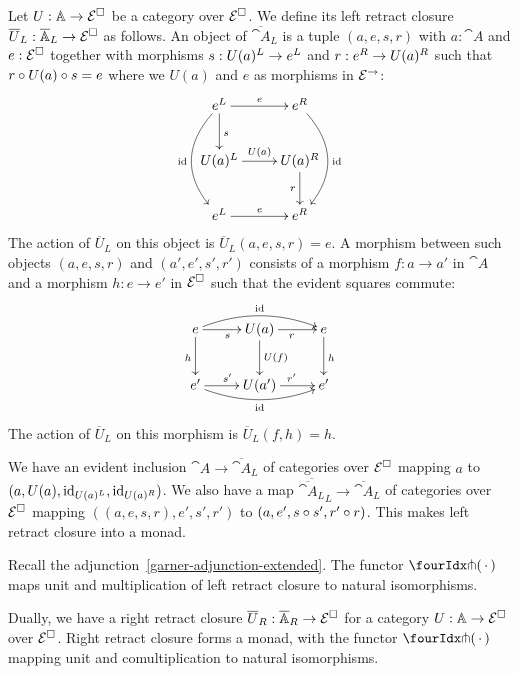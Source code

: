 \documentclass[reqno,10pt,a4paper,oneside]{amsart}
\begin{document}
Let $U : \mathbb{A} \to \mathcal{E}^{\Box}$ be a category over $\mathcal{E}^{\Box}$.
We define its left retract closure $\overline{U}_L : \overline{\mathbb{A}}_L \to \mathcal{E}^{\Box}$ as follows.
An object of $\overline{\cat{A}}_L$ is a tuple $(a, e, s, r)$ with $a : \cat{A}$ and $e : \mathcal{E}^{\Box}$ together with morphisms $s : U(a){}^L \to e{}^L$ and $r : e{}^R \to U(a){}^R$ such that $r \mathbin{\circ} U(a) \mathbin{\circ} s = e$ where we $U(a)$ and $e$ as morphisms in $\mathcal{E}^{\to}$:
\[
\xymatrix{
  e\sql
  \ar[r]^{e}
  \ar[d]^{s}
  \ar@/_2em/[dd]_{\id}
&
  e\sqr
  \ar@/^2em/[dd]^{\id}
\\
  U(a)\sql
  \ar[r]^{U(a)}
&
  U(a)\sqr
  \ar[d]_{r}
\\
  e\sql
  \ar[r]^{e}
&
  e\sqr
}
\]
The action of $\overline{U}_L$ on this object is $\overline{U}_L(a, e, s, r) = e$.
A morphism between such objects $(a, e, s, r)$ and $(a', e', s', r')$ consists of a morphism $f : a \to a'$ in $\cat{A}$ and a morphism $h : e \to e'$ in $\mathcal{E}^{\Box}$ such that the evident squares commute:
\[
\xymatrix{
  e
  \ar[r]_{s}
  \ar@/^1em/[rr]^{\id}
  \ar[d]_{h}
&
  U(a)
  \ar[r]_{r}
  \ar[d]^{U(f)}
&
  e
  \ar[d]^{h}
\\
  e'
  \ar[r]^{s'}
  \ar@/_1em/[rr]_{\id}
&
  U(a')
  \ar[r]^{r'}
&
  e'
}
\]
The action of $\overline{U}_L$ on this morphism is $\overline{U}_L(f, h) = h$.

We have an evident inclusion $\cat{A} \to \overline{\cat{A}}_L$ of categories over $\mathcal{E}^{\Box}$ mapping $a$ to $(a, U(a), \operatorname{id}_{U(a){}^L}, \operatorname{id}_{U(a){}^R})$.
We also have a map $\overline{\overline{\cat{A}}_L}_L \to \overline{\cat{A}}_L$ of categories over $\mathcal{E}^{\Box}$ mapping $((a, e, s, r), e', s', r')$ to $(a, e', s \mathbin{\circ} s', r' \mathbin{\circ} r)$.
This makes left retract closure into a monad.

\begin{lemma}
\label{retract-closure-extended-left}
Recall the adjunction~\eqref{garner-adjunction-extended}.
The functor $\liftr{\brarghole}$ maps unit and multiplication of left retract closure to natural isomorphisms.
\end{lemma}

\begin{remark}
\label{retract-closure-extended-right}
Dually, we have a right retract closure $\overline{U}_R : \overline{\mathbb{A}}_R \to \mathcal{E}^{\Box}$ for a category $U : \mathbb{A} \to \mathcal{E}^{\Box}$ over $\mathcal{E}^{\Box}$.
Right retract closure forms a monad, with the functor $\liftl{\brarghole}$ mapping unit and comultiplication to natural isomorphisms.
\end{remark}
\end{document}
